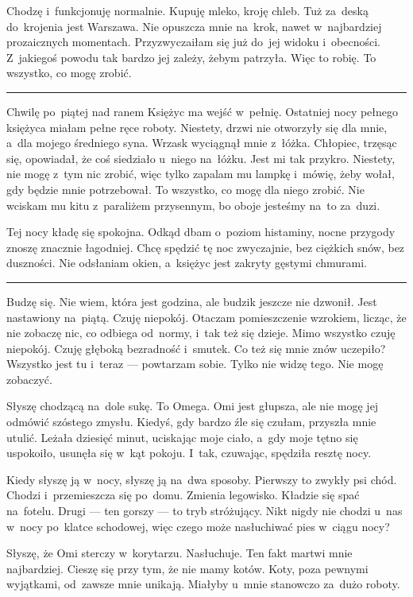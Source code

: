 \documentclass[9pt, a5paper]{memoir}
\begin{document}
Chodzę i~funkcjonuję normalnie. Kupuję mleko, kroję chleb. Tuż za~deską do~krojenia jest Warszawa. Nie opuszcza mnie na~krok, nawet w~najbardziej prozaicznych momentach. Przyzwyczaiłam się już do~jej widoku i~obecności. Z~jakiegoś powodu tak bardzo jej zależy, żebym patrzyła. Więc to robię. To wszystko, co mogę zrobić.

\fancybreak{* \quad * \quad *}

Chwilę po~piątej nad ranem Księżyc ma wejść w~pełnię. Ostatniej nocy pełnego księżyca miałam pełne ręce roboty. Niestety, drzwi nie otworzyły się dla mnie, a~dla mojego średniego syna. Wrzask wyciągnął mnie z~łóżka. Chłopiec, trzęsąc się, opowiadał, że coś siedziało u~niego na~łóżku. Jest mi tak przykro. Niestety, nie mogę z~tym nic zrobić, więc tylko zapalam mu lampkę i~mówię, żeby wołał, gdy będzie mnie potrzebował. To wszystko, co mogę dla niego zrobić. Nie wciskam mu kitu z~paraliżem przysennym, bo oboje jesteśmy na~to za~duzi.

Tej nocy kładę się spokojna. Odkąd dbam o~poziom histaminy, nocne przygody znoszę znacznie łagodniej. Chcę spędzić tę noc zwyczajnie, bez ciężkich snów, bez duszności. Nie odsłaniam okien, a~księżyc jest zakryty gęstymi chmurami.

\fancybreak{* \quad * \quad *}

Budzę się. Nie wiem, która jest godzina, ale budzik jeszcze nie dzwonił. Jest nastawiony na~piątą. Czuję niepokój. Otaczam pomieszczenie wzrokiem, licząc, że nie zobaczę nic, co odbiega od~normy, i~tak też się dzieje. Mimo wszystko czuję niepokój. Czuję głęboką bezradność i~smutek. Co też się mnie znów uczepiło? Wszystko jest tu i~teraz --- powtarzam sobie. Tylko nie widzę tego. Nie mogę zobaczyć.

Słyszę chodzącą na~dole sukę. To Omega. Omi jest głupsza, ale nie mogę jej odmówić szóstego zmysłu. Kiedyś, gdy bardzo źle się czułam, przyszła mnie utulić. Leżała dziesięć minut, uciskając moje ciało, a~gdy moje tętno się uspokoiło, usunęła się w~kąt pokoju. I~tak, czuwając, spędziła resztę nocy.

Kiedy słyszę ją w~nocy, słyszę ją na~dwa sposoby. Pierwszy to zwykły psi chód. Chodzi i~przemieszcza się po~domu. Zmienia legowisko. Kładzie się spać na~fotelu. Drugi --- ten gorszy --- to tryb stróżujący. Nikt nigdy nie chodzi u~nas w~nocy po~klatce schodowej, więc czego może nasłuchiwać pies w~ciągu nocy?

Słyszę, że Omi sterczy w~korytarzu. Nasłuchuje. Ten fakt martwi mnie najbardziej. Cieszę się przy tym, że nie mamy kotów. Koty, poza pewnymi wyjątkami, od~zawsze mnie unikają. Miałyby u~mnie stanowczo za~dużo roboty.
\end{document}
